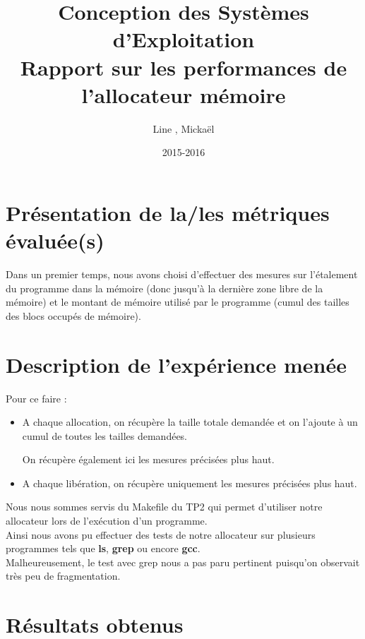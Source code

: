 \documentclass{article}
\title{Conception des Systèmes d'Exploitation\\Rapport sur les performances de l'allocateur mémoire}
\author{Line \bsc{POUVARET}, Mickaël \bsc{TURNEL}}
\date{2015-2016}
\begin{document}
\maketitle
\section{Présentation de la/les métriques évaluée(s)}
Dans un premier temps, nous avons choisi d'effectuer des mesures sur l'étalement du programme dans la mémoire (donc jusqu'à la dernière zone libre de la mémoire) et le montant de mémoire utilisé par le programme (cumul des tailles des blocs occupés de mémoire).

\section{Description de l'expérience menée}
Pour ce faire :
\begin{itemize}
\item A chaque allocation, on récupère la taille totale demandée et on l'ajoute à un cumul de toutes les tailles demandées.

On récupère également ici les mesures précisées plus haut.

\item A chaque libération, on récupère uniquement les mesures précisées plus haut.
\end{itemize}

Nous nous sommes servis du Makefile du TP2 qui permet d'utiliser notre allocateur lors de l'exécution d'un programme.\\

Ainsi nous avons pu effectuer des tests de notre allocateur sur plusieurs programmes tels que \textbf{ls}, \textbf{grep} ou encore \textbf{gcc}.\\

Malheureusement, le test avec grep nous a pas paru pertinent puisqu'on observait très peu de fragmentation.

\section{Résultats obtenus}
\end{document}
